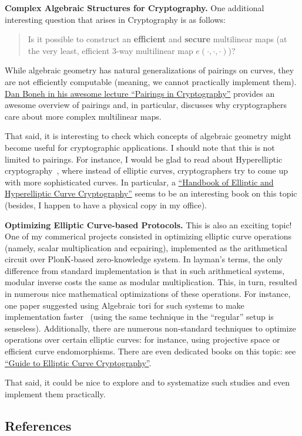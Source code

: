 \documentclass{template}
\begin{document}
\textbf{Complex Algebraic Structures for Cryptography.} One additional 
interesting question that arises in Cryptography is as follows:
\begin{quote}
    Is it possible to construct an \textbf{efficient} and \textbf{secure}
    multilinear maps (at the very least, efficient 3-way multilinear map
    $e(\cdot,\cdot,\cdot)$)?
\end{quote}
While algebraic geometry has natural generalizations of pairings on curves,
they are not efficiently computable (meaning, we cannot practically
implement them). \href{https://www.youtube.com/watch?v=8WDOpzxpnTE}{Dan
Boneh in his awesome lecture ``Pairings in Cryptography''} provides an
awesome overview of pairings and, in particular, discusses why
cryptographers care about more complex multilinear maps.

That said, it is interesting to check which concepts of algebraic geometry might
become useful for cryptographic applications. I should note that this is not
limited to pairings. For instance, I would be glad to read about Hyperelliptic
cryptography~\cite{hyperelliptic}, where instead of elliptic curves,
cryptographers try to come up with more sophisticated curves. In particular, a
\href{http://pustaka.unp.ac.id/file/abstrak_kki/EBOOKS/Kriptografi%20dan%20Ethical%20Hacking%20B.pdf}{``Handbook of Elliptic and Hyperelliptic Curve Cryptography''} 
seems to be an interesting book on this topic (besides, I happen to have a
physical copy in my office).

\textbf{Optimizing Elliptic Curve-based Protocols.} This is also an exciting
topic! One of my commerical projects consisted in optimizing elliptic curve
operations (namely, scalar multiplication and ecpairing), implemented as the
arithmetical circuit over PlonK-based zero-knowledge system. In layman's terms,
the only difference from standard implementation is that in such arithmetical
systems, modular inverse costs the same as modular multiplication. This, in
turn, resulted in numerous nice mathematical optimizations of these operations.
For instance, one paper suggested using Algebraic tori for such systems to make
implementation faster~\cite{r1cs} (using the same technique in the ``regular''
setup is senseless). Additionally, there are numerous non-standard techniques to
optimize operations over certain elliptic curves: for instance, using projective
space or efficient curve endomorphisms. There are even dedicated books on this
topic: see
\href{https://link.springer.com/book/10.1007/b97644}{``Guide to Elliptic Curve Cryptography''}.

That said, it could be nice to explore and to systematize such studies and even
implement them practically.

\subsection*{References}
\renewcommand{\refname}{\vspace{-1em}}


\end{document}
